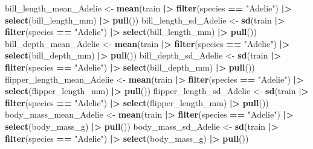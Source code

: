\documentclass[
]{article}
\newenvironment{Shaded}{\begin{snugshade}}{\end{snugshade}}
\newcommand{\FunctionTok}[1]{\textcolor[rgb]{0.13,0.29,0.53}{\textbf{#1}}}
\newcommand{\NormalTok}[1]{#1}
\newcommand{\OtherTok}[1]{\textcolor[rgb]{0.56,0.35,0.01}{#1}}
\newcommand{\SpecialCharTok}[1]{\textcolor[rgb]{0.81,0.36,0.00}{\textbf{#1}}}
\newcommand{\StringTok}[1]{\textcolor[rgb]{0.31,0.60,0.02}{#1}}
\begin{document}
\begin{Shaded}
\begin{Highlighting}[]
\NormalTok{bill\_length\_mean\_Adelie }\OtherTok{\textless{}{-}} \FunctionTok{mean}\NormalTok{(train }\SpecialCharTok{|\textgreater{}} \FunctionTok{filter}\NormalTok{(species }\SpecialCharTok{==} \StringTok{"Adelie"}\NormalTok{) }\SpecialCharTok{|\textgreater{}} \FunctionTok{select}\NormalTok{(bill\_length\_mm) }\SpecialCharTok{|\textgreater{}} \FunctionTok{pull}\NormalTok{())}
\NormalTok{bill\_length\_sd\_Adelie }\OtherTok{\textless{}{-}} \FunctionTok{sd}\NormalTok{(train }\SpecialCharTok{|\textgreater{}} \FunctionTok{filter}\NormalTok{(species }\SpecialCharTok{==} \StringTok{"Adelie"}\NormalTok{) }\SpecialCharTok{|\textgreater{}} \FunctionTok{select}\NormalTok{(bill\_length\_mm) }\SpecialCharTok{|\textgreater{}} \FunctionTok{pull}\NormalTok{())}
\NormalTok{bill\_depth\_mean\_Adelie }\OtherTok{\textless{}{-}} \FunctionTok{mean}\NormalTok{(train }\SpecialCharTok{|\textgreater{}} \FunctionTok{filter}\NormalTok{(species }\SpecialCharTok{==} \StringTok{"Adelie"}\NormalTok{) }\SpecialCharTok{|\textgreater{}} \FunctionTok{select}\NormalTok{(bill\_depth\_mm) }\SpecialCharTok{|\textgreater{}} \FunctionTok{pull}\NormalTok{())}
\NormalTok{bill\_depth\_sd\_Adelie }\OtherTok{\textless{}{-}} \FunctionTok{sd}\NormalTok{(train }\SpecialCharTok{|\textgreater{}} \FunctionTok{filter}\NormalTok{(species }\SpecialCharTok{==} \StringTok{"Adelie"}\NormalTok{) }\SpecialCharTok{|\textgreater{}} \FunctionTok{select}\NormalTok{(bill\_depth\_mm) }\SpecialCharTok{|\textgreater{}} \FunctionTok{pull}\NormalTok{())}
\NormalTok{flipper\_length\_mean\_Adelie }\OtherTok{\textless{}{-}} \FunctionTok{mean}\NormalTok{(train }\SpecialCharTok{|\textgreater{}} \FunctionTok{filter}\NormalTok{(species }\SpecialCharTok{==} \StringTok{"Adelie"}\NormalTok{) }\SpecialCharTok{|\textgreater{}} \FunctionTok{select}\NormalTok{(flipper\_length\_mm) }\SpecialCharTok{|\textgreater{}} \FunctionTok{pull}\NormalTok{())}
\NormalTok{flipper\_length\_sd\_Adelie }\OtherTok{\textless{}{-}} \FunctionTok{sd}\NormalTok{(train }\SpecialCharTok{|\textgreater{}} \FunctionTok{filter}\NormalTok{(species }\SpecialCharTok{==} \StringTok{"Adelie"}\NormalTok{) }\SpecialCharTok{|\textgreater{}} \FunctionTok{select}\NormalTok{(flipper\_length\_mm) }\SpecialCharTok{|\textgreater{}} \FunctionTok{pull}\NormalTok{())}
\NormalTok{body\_mass\_mean\_Adelie }\OtherTok{\textless{}{-}} \FunctionTok{mean}\NormalTok{(train }\SpecialCharTok{|\textgreater{}} \FunctionTok{filter}\NormalTok{(species }\SpecialCharTok{==} \StringTok{"Adelie"}\NormalTok{) }\SpecialCharTok{|\textgreater{}} \FunctionTok{select}\NormalTok{(body\_mass\_g) }\SpecialCharTok{|\textgreater{}} \FunctionTok{pull}\NormalTok{())}
\NormalTok{body\_mass\_sd\_Adelie }\OtherTok{\textless{}{-}} \FunctionTok{sd}\NormalTok{(train }\SpecialCharTok{|\textgreater{}} \FunctionTok{filter}\NormalTok{(species }\SpecialCharTok{==} \StringTok{"Adelie"}\NormalTok{) }\SpecialCharTok{|\textgreater{}} \FunctionTok{select}\NormalTok{(body\_mass\_g) }\SpecialCharTok{|\textgreater{}} \FunctionTok{pull}\NormalTok{())}


\end{Highlighting}
\end{Shaded}
\end{document}
